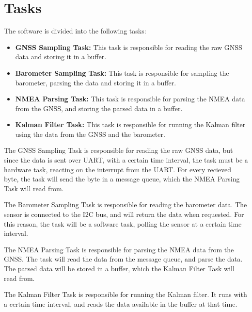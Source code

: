 \section{Tasks}
The software is divided into the following tasks:
\begin{itemize}
    \item \textbf{GNSS Sampling Task:} This task is responsible for reading the raw GNSS data and storing it in a buffer.
    \item \textbf{Barometer Sampling Task:} This task is responsible for sampling the barometer, parsing the data and storing it in a buffer.
    \item \textbf{NMEA Parsing Task:} This task is responsible for parsing the NMEA data from the GNSS, and storing the parsed data in a buffer.
    \item \textbf{Kalman Filter Task:} This task is responsible for running the Kalman filter using the data from the GNSS and the barometer.
\end{itemize}

The GNSS Sampling Task is responsible for reading the raw GNSS data, but since the data is sent over UART, with a certain time interval, the task must be a hardware task, reacting on the interrupt from the UART.
For every recieved byte, the task will send the byte in a message queue, which the NMEA Parsing Task will read from.

The Barometer Sampling Task is responsible for reading the barometer data.
The sensor is connected to the I2C bus, and will return the data when requested.
For this reason, the task will be a software task, polling the sensor at a certain time interval.

The NMEA Parsing Task is responsible for parsing the NMEA data from the GNSS.
The task will read the data from the message queue, and parse the data.
The parsed data will be stored in a buffer, which the Kalman Filter Task will read from.

The Kalman Filter Task is responsible for running the Kalman filter.
It runs with a certain time interval, and reads the data available in the buffer at that time.


%
